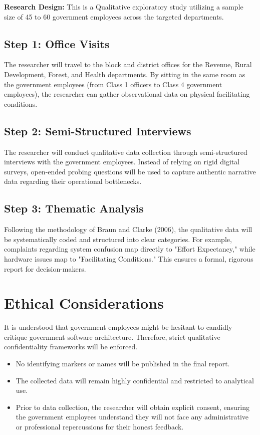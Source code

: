 \documentclass[11pt,a4paper]{article}
\begin{document}
\textbf{Research Design:} This is a Qualitative exploratory study utilizing a sample size of 45 to 60 government employees across the targeted departments.

\subsection*{Step 1: Office Visits}
The researcher will travel to the block and district offices for the Revenue, Rural Development, Forest, and Health departments. By sitting in the same room as the government employees (from Class 1 officers to Class 4 government employees), the researcher can gather observational data on physical facilitating conditions.

\subsection*{Step 2: Semi-Structured Interviews}
The researcher will conduct qualitative data collection through semi-structured interviews with the government employees. Instead of relying on rigid digital surveys, open-ended probing questions will be used to capture authentic narrative data regarding their operational bottlenecks.

\subsection*{Step 3: Thematic Analysis}
Following the methodology of Braun and Clarke (2006), the qualitative data will be systematically coded and structured into clear categories. For example, complaints regarding system confusion map directly to "Effort Expectancy," while hardware issues map to "Facilitating Conditions." This ensures a formal, rigorous report for decision-makers.

\section{Ethical Considerations}

\vspace{0.2cm}
It is understood that government employees might be hesitant to candidly critique government software architecture. Therefore, strict qualitative confidentiality frameworks will be enforced.
\begin{itemize}
  \item No identifying markers or names will be published in the final report.
  \item The collected data will remain highly confidential and restricted to analytical use.
  \item Prior to data collection, the researcher will obtain explicit consent, ensuring the government employees understand they will not face any administrative or professional repercussions for their honest feedback.
\end{itemize}
\end{document}
